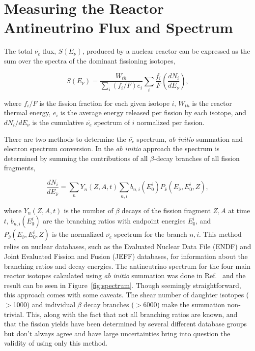 \section{Measuring the Reactor Antineutrino Flux and Spectrum}

The total $\bar{\nu_{e}}$ flux, $S(E_\nu)$, produced by a nuclear reactor can be expressed as the sum over the spectra of the dominant fissioning isotopes,

\begin{equation}
	S(E_\nu) = \frac{W_{th}}{\sum_{i}(f_i/F)e_i}\sum_{i}\frac{f_i}{F}\left(\frac{dN_i}{dE_\nu}\right) ,
\end{equation}

where $f_i/F$ is the fission fraction for each given isotope $i$, $W_{th}$ is the reactor thermal energy, $e_i$ is the 
average energy released per fission by each isotope, and $dN_i/dE_\nu$ is the cumulative $\bar{\nu_e}$ spectrum of $i$ normalized per fission.

There are two methods to determine the $\bar{\nu_e}$ spectrum, \textit{ab initio} summation and electron spectrum conversion.
In the \textit{ab initio} approach the spectrum is determined by summing the contributions of all $\beta$-decay branches of all fission fragments,

\begin{equation}
	\frac{dN_i}{dE_{\bar{\nu}}} =  \sum_{n}Y_n(Z,A,t)\sum_{n,i}b_{n,i}(E^i_0)P_{\bar{\nu}}(E_{\bar{\nu}},E^i_0,Z) ,
\end{equation}

where $Y_n(Z,A,t)$ is the number of $\beta$ decays of the fission fragment $Z, A$ at time $t$, $b_{n,i}(E^i_0)$ are the branching ratios with endpoint energies $E^i_0$, and $P_{\bar{\nu}}(E_{\bar{\nu}},E^i_0,Z)$ is the normalized $\bar{\nu_e}$ spectrum for the branch $n, i$.
This method relies on nuclear databases, such as the Evaluated Nuclear Data File (ENDF) and Joint Evaluated Fission and Fusion (JEFF) databases, for information about the branching ratios and decay energies. 
The antineutrino spectrum for the four main reactor isotopes calculated using \textit{ab initio} summation was done in Ref.~\cite{HayesVogel} and the result can be seen in Figure~\ref{fig:spectrum}. 
Though seemingly straightforward, this approach comes with some caveats.
The shear number of daughter isotopes ($>$1000) and individual $\beta$ decay branches ($>$6000) make the summation non-trivial.
This, along with the fact that not all branching ratios are known, and that the fission yields have been determined by several different database groups but don't always agree and have large uncertainties bring into question the validity of using only this method. 

